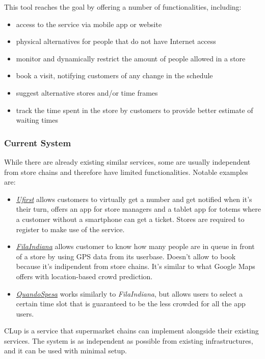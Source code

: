 This tool reaches the goal by offering a number of functionalities, including:
\begin{itemize}
    \item access to the service via mobile app or website
    \item physical alternatives for people that do not have Internet access
    \item monitor and dynamically restrict the amount of people allowed in a store
    \item book a visit, notifying customers of any change in the schedule
    \item suggest alternative stores and/or time frames
    \item track the time spent in the store by customers to provide better estimate of waiting times
\end{itemize}



\subsubsection{Current System}
While there are already existing similar services, some are usually independent from store chains and
therefore have limited functionalities.
Notable examples are:
\begin{itemize}
    \item \href{https://www.ufirst.com}{\emph{Ufirst}} allows customers to virtually get a number
        and get notified when it's their turn, offers an app for store managers and a tablet app for totems
        where a customer without a smartphone can get a ticket. Stores are required to register to make use
        of the service.
    \item \href{https://play.google.com/store/apps/details?id=com.codaliscia}{\emph{FilaIndiana}} allows customer to
        know how many people are in queue in front of a store by using GPS data from its userbase. Doesn't allow to
        book because it's indipendent from store chains. It's similar to what Google Maps offers with location-based
        crowd prediction.
    \item \href{https://play.google.com/store/apps/details?id=it.anybot.quandospesa}{\emph{QuandoSpesa}} works similarly
        to \emph{FilaIndiana}, but allows users to select a certain time slot that is guaranteed to be the less crowded
        for all the app users.
    
\end{itemize} 
CLup is a service that supermarket chains can implement alongside
their existing services. The system is as independent as possible from existing infrastructures, and
it can be used with minimal setup.

